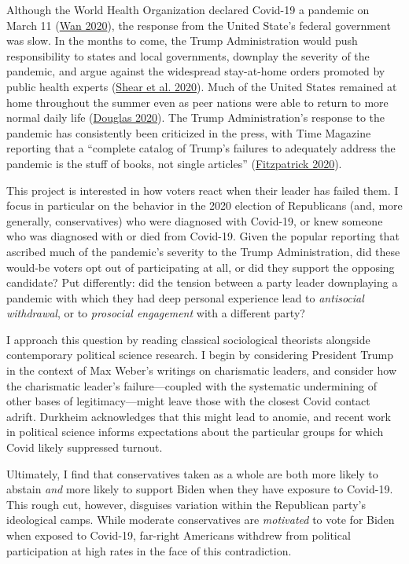 \documentclass[
  12pt,
]{article}
\begin{document}
Although the World Health Organization declared Covid-19 a pandemic on March 11 (\protect\hyperlink{ref-Wan2020}{Wan 2020}), the response from the United State's federal government was slow. In the months to come, the Trump Administration would push responsibility to states and local governments, downplay the severity of the pandemic, and argue against the widespread stay-at-home orders promoted by public health experts (\protect\hyperlink{ref-Shear2020}{Shear et al. 2020}). Much of the United States remained at home throughout the summer even as peer nations were able to return to more normal daily life (\protect\hyperlink{ref-Douglas2020}{Douglas 2020}). The Trump Administration's response to the pandemic has consistently been criticized in the press, with Time Magazine reporting that a ``complete catalog of Trump's failures to adequately address the pandemic is the stuff of books, not single articles'' (\protect\hyperlink{ref-Fitzpatrick2020}{Fitzpatrick 2020}).

This project is interested in how voters react when their leader has failed them. I focus in particular on the behavior in the 2020 election of Republicans (and, more generally, conservatives) who were diagnosed with Covid-19, or knew someone who was diagnosed with or died from Covid-19. Given the popular reporting that ascribed much of the pandemic's severity to the Trump Administration, did these would-be voters opt out of participating at all, or did they support the opposing candidate? Put differently: did the tension between a party leader downplaying a pandemic with which they had deep personal experience lead to \emph{antisocial withdrawal}, or to \emph{prosocial engagement} with a different party?

I approach this question by reading classical sociological theorists alongside contemporary political science research. I begin by considering President Trump in the context of Max Weber's writings on charismatic leaders, and consider how the charismatic leader's failure---coupled with the systematic undermining of other bases of legitimacy---might leave those with the closest Covid contact adrift. Durkheim acknowledges that this might lead to anomie, and recent work in political science informs expectations about the particular groups for which Covid likely suppressed turnout.

Ultimately, I find that conservatives taken as a whole are both more likely to abstain \emph{and} more likely to support Biden when they have exposure to Covid-19. This rough cut, however, disguises variation within the Republican party's ideological camps. While moderate conservatives are \emph{motivated} to vote for Biden when exposed to Covid-19, far-right Americans withdrew from political participation at high rates in the face of this contradiction.
\end{document}
